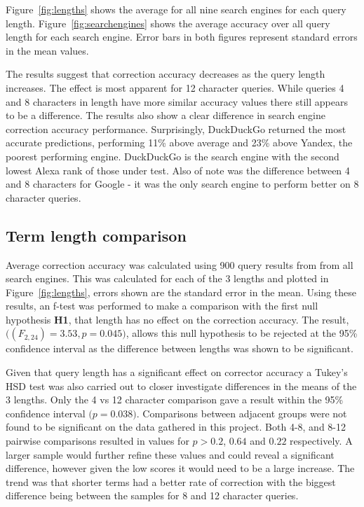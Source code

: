 \documentclass{csfourzero}
\begin{document}
Figure~\ref{fig:lengths} shows the average for all nine search engines for each query length. Figure~\ref{fig:searchengines} shows the average accuracy over all query length for each search engine. Error bars in both figures represent standard errors in the mean values.

The results suggest that correction accuracy decreases as the query length increases. The effect is most apparent for 12 character queries. While queries 4 and 8 characters in length have more similar accuracy values there still appears to be a difference. The results also show a clear difference in search engine correction accuracy performance. Surprisingly, DuckDuckGo returned the most accurate predictions, performing 11\% above average and 23\% above Yandex, the poorest performing engine. DuckDuckGo is the search engine with the second lowest Alexa rank of those under test. Also of note was the difference between 4 and 8 characters for Google - it was the only search engine to perform better on 8 character queries.

\subsection{Term length comparison}
Average correction accuracy was calculated using 900 query results from from all search engines. This was calculated for each of the 3 lengths and plotted in Figure~\ref{fig:lengths}, errors shown are the standard error in the mean. Using these results, an f-test was performed to make a comparison with the first null hypothesis \textbf{H1}, that length has no effect on the correction accuracy. The result, $\big((F_{2,24}) = 3.53, p = 0.045\big)$, allows this null hypothesis to be rejected at the 95\% confidence interval as the difference between lengths was shown to be significant.

Given that query length has a significant effect on corrector accuracy a Tukey's HSD test was also carried out to closer investigate differences in the means of the 3 lengths. Only the 4 vs 12 character comparison gave a result within the 95\% confidence interval $\big(p = 0.038\big)$. Comparisons between adjacent groups were not found to be significant on the data gathered in this project. Both 4-8, and 8-12 pairwise comparisons resulted in values for $p > 0.2$, $0.64$ and $0.22$ respectively. A larger sample would further refine these values and could reveal a significant difference, however given the low scores it would need to be a large increase. The trend was that shorter terms had a better rate of correction with the biggest difference being between the samples for 8 and 12 character queries.
\end{document}
